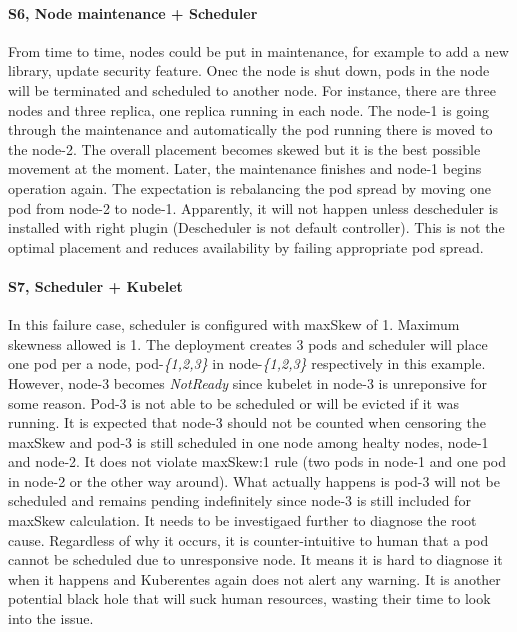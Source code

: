 \paragraph*{S6, Node maintenance + Scheduler}
From time to time, nodes could be put in maintenance, for example to add a new library, update security feature. Onec the node is shut down, pods in the node will be terminated and scheduled to another node. For instance, there are three nodes and three replica, one replica running in each node. The node-1 is going through the maintenance and automatically the pod running there is moved to the node-2. The overall placement becomes skewed but it is the best possible movement at the moment. Later, the maintenance finishes and node-1 begins operation again. The expectation is rebalancing the pod spread by moving one pod from node-2 to node-1. Apparently, it will not happen unless descheduler is installed with right plugin (Descheduler is not default controller). This is not the optimal placement and reduces availability by failing appropriate pod spread. 


\paragraph*{S7, Scheduler + Kubelet}
In this failure case, scheduler is configured with maxSkew of 1. Maximum skewness allowed is 1. The deployment creates 3 pods and scheduler will place one pod per a node, pod-\textit{\{1,2,3\}} in node-\textit{\{1,2,3\}} respectively in this example. However, node-3 becomes \textit{NotReady} since kubelet in node-3 is unreponsive for some reason. Pod-3 is not able to be scheduled or will be evicted if it was running. It is expected that node-3 should not be counted when censoring the maxSkew and pod-3 is still scheduled in one node among healty nodes, node-1 and node-2. It does not violate maxSkew:1 rule (two pods in node-1 and one pod in node-2 or the other way around). What actually happens is pod-3 will not be scheduled and remains pending indefinitely since node-3 is still included for maxSkew calculation. It needs to be investigaed further to diagnose the root cause. Regardless of why it occurs, it is counter-intuitive to human that a pod cannot be scheduled due to unresponsive node. It means it is hard to diagnose it when it happens and Kuberentes again does not alert any warning. It is another potential black hole that will suck human resources, wasting their time to look into the issue.


